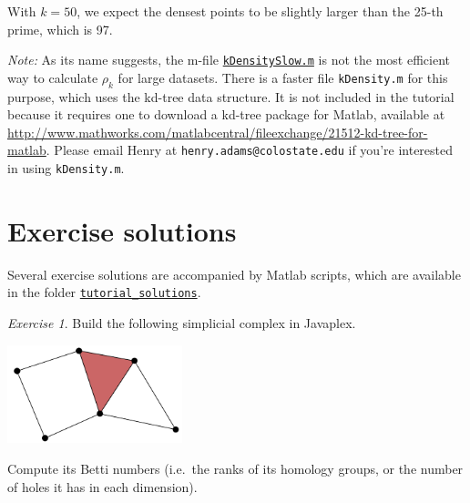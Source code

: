 \documentclass[amscd, amssymb, verbatim]{amsart}[12pt]
\theoremstyle{remark}
\theoremstyle{remark}
\newtheorem{exerciseSol}{Exercise}
\theoremstyle{remark}
\begin{document}
With $k = 50$, we expect the densest points to be slightly larger than the 25-th prime, which is 97. 

{\em Note:} As its name suggests, the m-file \href{https://github.com/appliedtopology/javaplex/tree/master/src/matlab/for_distribution/tutorial_examples/kDensitySlow.m}{\texttt{kDensitySlow.m}} is not the most efficient way to calculate $\rho_k$ for large datasets. There is a faster file \texttt{kDensity.m} for this purpose, which uses the kd-tree data structure. It is not included in the tutorial because it requires one to download a kd-tree package for Matlab, available at \url{http://www.mathworks.com/matlabcentral/fileexchange/21512-kd-tree-for-matlab}. Please email Henry at \texttt{henry.adams@colostate.edu} if you're interested in using \texttt{kDensity.m}. 






\section{Exercise solutions}\label{A:solutions}

Several exercise solutions are accompanied by Matlab scripts, which are available in the folder \href{https://github.com/appliedtopology/javaplex/tree/master/src/matlab/for_distribution/tutorial_solutions}{\texttt{tutorial\_solutions}}.

\begin{exerciseSol}
Build the following simplicial complex in Javaplex.
\begin{center}
\includegraphics[width=2in]{smallSimplicialComplex.png}
\end{center}
Compute its Betti numbers (i.e.\ the ranks of its homology groups, or the number of holes it has in each dimension).
\end{exerciseSol}
\end{document}
